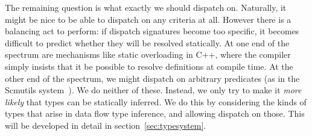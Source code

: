 




The remaining question is what exactly we should dispatch on.
Naturally, it might be nice to be able to dispatch on any criteria
at all.
However there is a balancing act to perform: if dispatch signatures
become too specific, it becomes difficult to predict whether they
will be resolved statically.
At one end of the spectrum are mechanisms like static overloading
in C++, where the compiler simply insists that it be possible to
resolve definitions at compile time.
At the other end of the spectrum, we might dispatch on arbitrary
predicates (as in the Scmutils system~\cite{Sussman:2001:SIC:375178}).
We do neither of these.
Instead, we only try to make it \emph{more likely} that types can be
statically inferred.
We do this by considering the kinds of types that arise in data flow
type inference, and allowing dispatch on those.
This will be developed in detail in section~\ref{sec:typesystem}.

